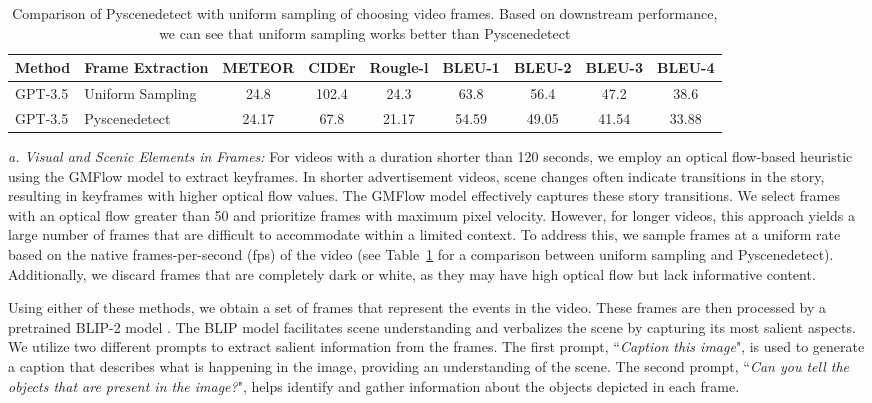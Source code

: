 \begin{table}[!h]\centering
\begin{adjustbox}{width =\textwidth}
\begin{tabular}{llccccccc}\toprule[1.5pt]
\textbf{Method} &\textbf{Frame Extraction} &\textbf{METEOR} & \textbf{CIDEr} &\textbf{Rougle-l} &\textbf{BLEU-1}&\textbf{BLEU-2}&\textbf{BLEU-3}&\textbf{BLEU-4}\\\toprule[0.5pt]
GPT-3.5 & Uniform Sampling & 24.8 & 102.4 & 24.3 & 63.8 & 56.4 & 47.2 & 38.6 \\
GPT-3.5 & Pyscenedetect & 24.17 & 67.8 & 21.17 & 54.59 & 49.05 & 41.54 & 33.88 \\\bottomrule[1.5pt]
\end{tabular}
\end{adjustbox}
\caption{Comparison of Pyscenedetect \cite{breakthrough-pyscenedetect} with uniform sampling of choosing video frames. Based on downstream performance, we can see that uniform sampling works better than Pyscenedetect  \label{tab:ablation-sampling}}
\end{table}

\textit{a. Visual and Scenic Elements in Frames:} For videos with a duration shorter than 120 seconds, we employ an optical flow-based heuristic using the GMFlow model \cite{xu2022gmflow} to extract keyframes. In shorter advertisement videos, scene changes often indicate transitions in the story, resulting in keyframes with higher optical flow values. The GMFlow model effectively captures these story transitions. We select frames with an optical flow greater than 50 and prioritize frames with maximum pixel velocity. However, for longer videos, this approach yields a large number of frames that are difficult to accommodate within a limited context. To address this, we sample frames at a uniform rate based on the native frames-per-second (fps) of the video (see Table~\ref{tab:ablation-sampling} for a comparison between uniform sampling and Pyscenedetect). Additionally, we discard frames that are completely dark or white, as they may have high optical flow but lack informative content.

Using either of these methods, we obtain a set of frames that represent the events in the video. These frames are then processed by a pretrained BLIP-2 model \cite{li2023blip2}. The BLIP model facilitates scene understanding and verbalizes the scene by capturing its most salient aspects. We utilize two different prompts to extract salient information from the frames. The first prompt, ``\textit{Caption this image}", is used to generate a caption that describes what is happening in the image, providing an understanding of the scene. The second prompt, ``\textit{Can you tell the objects that are present in the image?}", helps identify and gather information about the objects depicted in each frame.



